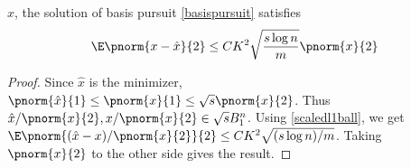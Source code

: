 \begin{theorem}\label{basispursuiterror}
	$\hat{x}$, the solution of basis pursuit \eqref{basispursuit} satisfies
	\begin{equation*}
		\E\pnorm{x-\hat{x}}{2}\leq CK^2\sqrt{\frac{s\log n}{m}}\pnorm{x}{2}
	\end{equation*}
\end{theorem}
\begin{proof}
	Since $\hat{x}$ is the minimizer, $\pnorm{\hat{x}}{1}\leq \pnorm{x}{1}\leq \sqrt{s}\pnorm{x}{2}$.
	Thus $\hat{x}/\pnorm{x}{2}, x/\pnorm{x}{2}\in \sqrt{s}B_1^n$.
	Using \eqref{scaledl1ball}, we get
	$\E\pnorm{(\hat{x}-x)/\pnorm{x}{2}}{2}\leq CK^2\sqrt{(s\log n)/m}$.
	Taking $\pnorm{x}{2}$ to the other side gives the result.
\end{proof}
